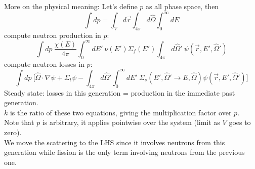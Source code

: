 \documentclass[12pt]{article}
\newcommand{\rvec}{\ensuremath{\vec{r}}}
\newcommand{\vOmega}{\ensuremath{\hat{\Omega}}}
\begin{document}
More on the physical meaning: Let's define $p$ as all phase space, then
  \[\int dp = \int_{V} d\rvec \int_{4 \pi} d\vOmega \int_0^{\infty} dE\]
compute neutron production in $p$:
  \[\int dp\:\frac{\chi(E)}{4 \pi}\int_0^{\infty} dE' \: \nu(E') \Sigma_f(E') \int_{4 \pi} d\vOmega' \:\psi(\vec{r}, E', \vOmega') \]
compute neutron losses in $p$:
  \[\int dp\:\biggl[\vOmega \cdot \nabla \psi + \Sigma_t \psi - \int_{4 \pi} d\vOmega' \int_0^{\infty} dE' \: \Sigma_s(E', \vOmega' \rightarrow E, \vOmega) \psi(\vec{r}, E', \vOmega') \biggr] \]
Steady state: losses in this generation = production in the immediate past generation.\\
$k$ is the ratio of these two equations, giving the multiplication factor over $p$.\\
Note that $p$ is arbitrary, it applies pointwise over the system (limit as $V$ goes to zero).\\
We move the scattering to the LHS since it involves neutrons from this generation while fission is the only term involving neutrons from the previous one.
\end{document}
